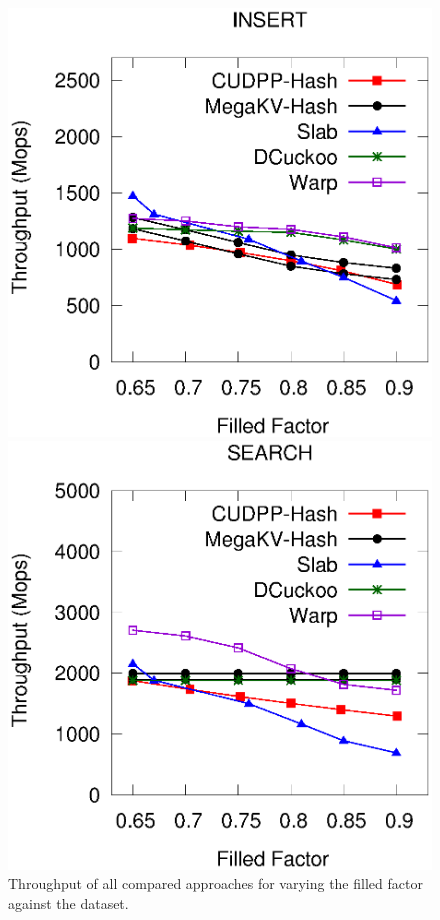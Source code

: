 \begin{figure}[h]
	\begin{minipage}{0.48\linewidth}\centering
		\includegraphics[width=\linewidth]{../pic/static-load_factor/tpch/insert.eps}
		\centerline{}
	\end{minipage}
	\hfill
	\begin{minipage}{0.48\linewidth}\centering
		\includegraphics[width=\linewidth]{../pic/static-load_factor/tpch/search.eps}
		\centerline{}
	\end{minipage}
	\caption{Throughput of all compared approaches for varying the filled factor against the \dstpch dataset.}
	\label{fig:static-filled-factor}
\end{figure}
\fi

